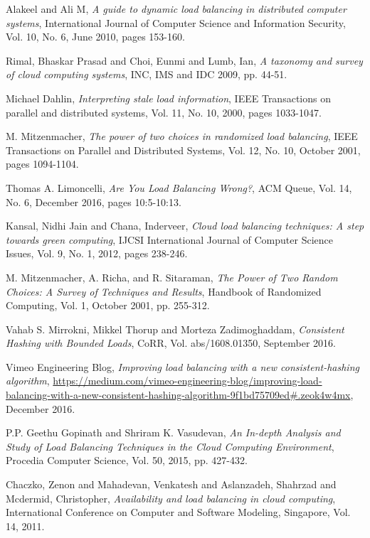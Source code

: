 \begin{thebibliography}{1}

Alakeel and Ali M, \emph{A guide to dynamic load balancing in distributed
  computer systems}, International Journal of Computer Science and Information
  Security, Vol. 10, No. 6, June 2010, pages 153-160.

  Rimal, Bhaskar Prasad and Choi, Eunmi and Lumb, Ian,
  \emph{A taxonomy and survey of cloud computing systems},
  INC, IMS and IDC
  2009, pp. 44-51.

Michael Dahlin, \emph{Interpreting stale load information},
  IEEE Transactions on parallel and distributed systems,
  Vol. 11, No. 10, 2000, pages 1033-1047.

M. Mitzenmacher, \emph{The power of two choices in randomized load balancing},
  IEEE Transactions on Parallel and Distributed Systems,
  Vol. 12, No. 10, October 2001, pages 1094-1104.

  Thomas A. Limoncelli, \emph{Are You Load Balancing Wrong?},
  ACM Queue,
  Vol. 14, No. 6, December 2016, pages 10:5-10:13.

  Kansal, Nidhi Jain and Chana, Inderveer,
  \emph{Cloud load balancing techniques: A step towards green computing},
  IJCSI International Journal of Computer Science Issues,
  Vol. 9, No. 1, 2012, pages 238-246.

M. Mitzenmacher, A. Richa, and R. Sitaraman,
  \emph{The Power of Two Random Choices: A Survey of Techniques and Results},
  Handbook of Randomized Computing,
  Vol. 1, October 2001, pp. 255-312.

Vahab S. Mirrokni, Mikkel Thorup and Morteza Zadimoghaddam,
  \emph{Consistent Hashing with Bounded Loads},
  CoRR,
  Vol. abs/1608.01350, September 2016.

Vimeo Engineering Blog, \emph{Improving load balancing with a new consistent-hashing algorithm},
  \url{https://medium.com/vimeo-engineering-blog/improving-load-balancing-with-a-new-consistent-hashing-algorithm-9f1bd75709ed#.zeok4w4mx},
  December 2016.

  P.P. Geethu Gopinath and Shriram K. Vasudevan, \emph{An In-depth Analysis and Study of Load Balancing Techniques in the Cloud Computing Environment},
  Procedia Computer Science,
  Vol. 50, 2015, pp. 427-432.

  Chaczko, Zenon and Mahadevan, Venkatesh and Aslanzadeh, Shahrzad and Mcdermid,
  Christopher,
  \emph{Availability and load balancing in cloud computing},
  International Conference on Computer and Software Modeling, Singapore,
  Vol. 14, 2011.

\end{thebibliography}
